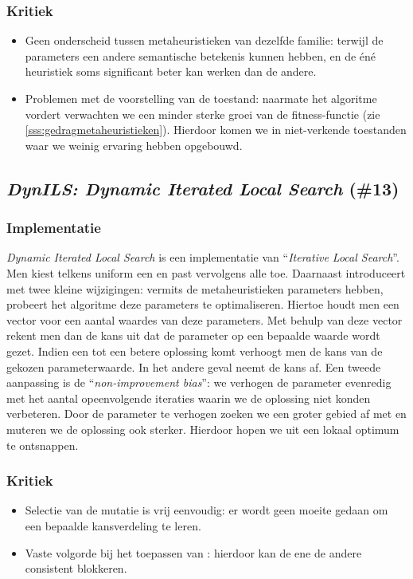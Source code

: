 \subsubsection{Kritiek}
\begin{itemize}
 \item Geen onderscheid tussen metaheuristieken van dezelfde familie: terwijl de parameters een andere semantische betekenis kunnen hebben, en de \'en\'e heuristiek soms significant beter kan werken dan de andere.
 \item Problemen met de voorstelling van de toestand: naarmate het algoritme vordert verwachten we een minder sterke groei van de fitness-functie (zie \ref{sss:gedragmetaheuristieken}). Hierdoor komen we in niet-verkende toestanden waar we weinig ervaring hebben opgebouwd.
\end{itemize}
\subsection{\emph{DynILS: Dynamic Iterated Local Search} (\#13)}
\label{sss:dyn-ils}
\subsubsection{Implementatie}
\emph{Dynamic Iterated Local Search}\cite{chesc-dynils,journals/orsnz/ksosils} is een implementatie van ``\emph{Iterative Local Search}''\cite{Lourenco02iteratedlocal}. Men kiest telkens uniform een \abpte{} \abllh{} en past vervolgens alle \abls{} \abhn{} toe. Daarnaast introduceert met twee kleine wijzigingen: vermits de metaheuristieken parameters hebben, probeert het algoritme deze parameters te optimaliseren. Hiertoe houdt men een vector voor een aantal waardes van deze parameters. Met behulp van deze vector rekent men dan de kans uit dat de parameter op een bepaalde waarde wordt gezet. Indien een \abllh{} tot een betere oplossing komt verhoogt men de kans van de gekozen parameterwaarde. In het andere geval neemt de kans af. Een tweede aanpassing is de ``\emph{non-improvement bias}'': we verhogen de parameter evenredig met het aantal opeenvolgende iteraties waarin we de oplossing niet konden verbeteren. Door de parameter te verhogen zoeken we een groter gebied af met \abls{} en muteren we de oplossing ook sterker. Hierdoor hopen we uit een lokaal optimum te ontsnappen.
\subsubsection{Kritiek}
\begin{itemize}
 \item Selectie van de mutatie is vrij eenvoudig: er wordt geen moeite gedaan om een bepaalde kansverdeling te leren.
 \item Vaste volgorde bij het toepassen van \abls{}: hierdoor kan de ene \abls{} \abh{} de andere consistent blokkeren.
\end{itemize}
